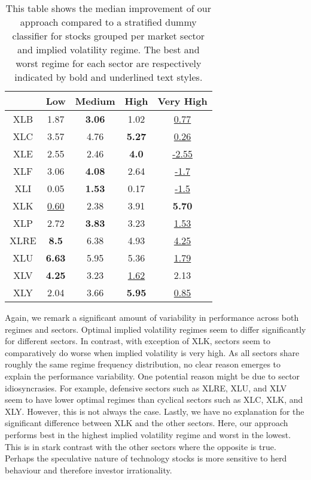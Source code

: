 \documentclass[preprint,1p, times,authoryear]{elsarticle}
\begin{document}
\begin{table}[!ht]
\centering
\setlength{\tabcolsep}{6pt}
\caption{This table shows the median improvement of our approach compared to a stratified dummy classifier for stocks grouped per market sector and implied volatility regime. The best and worst regime for each sector are respectively indicated by bold and underlined text styles.}
\begin{tabular}{ccccc}
\toprule
          & Low & Medium & High &  Very High \\
\midrule
XLB & 1.87 &	\textbf{3.06} &	1.02 &	\underline{0.77} \\
XLC & 3.57 &	4.76 &	\textbf{5.27} &	\underline{0.26} \\
XLE & 2.55 &	2.46 &	\textbf{4.0} &	\underline{-2.55} \\
XLF & 3.06 &	\textbf{4.08} &	2.64 &	\underline{-1.7} \\
XLI & 0.05 &	\textbf{1.53} &	0.17 &	\underline{-1.5} \\
XLK & \underline{0.60} &	2.38 &	3.91 &	\textbf{5.70} \\
XLP & 2.72 &	\textbf{3.83} &	3.23 &	\underline{1.53} \\
XLRE & \textbf{8.5} &	6.38 &	4.93 &	\underline{4.25} \\
XLU & \textbf{6.63} &	5.95 &	5.36 &	\underline{1.79} \\
XLV & \textbf{4.25} &	3.23 &	\underline{1.62} &	2.13 \\
XLY & 2.04 &	3.66 &	\textbf{5.95} & \underline{0.85} \\
\midrule
\end{tabular}
\label{tab:reg2}
\end{table}

Again, we remark a significant amount of variability in performance across both regimes and sectors. Optimal implied volatility regimes seem to differ significantly for different sectors. In contrast, with exception of XLK, sectors seem to comparatively do worse when implied volatility is very high. As all sectors share roughly the same regime frequency distribution, no clear reason emerges to explain the performance variability. One potential reason might be due to sector idiosyncrasies. For example, defensive sectors such as XLRE, XLU, and XLV seem to have lower optimal regimes than cyclical sectors such as XLC, XLK, and XLY. However, this is not always the case. Lastly, we have no explanation for the significant difference between XLK and the other sectors. Here, our approach performs best in the highest implied volatility regime and worst in the lowest. This is in stark contrast with the other sectors where the opposite is true. Perhaps the speculative nature of technology stocks is more sensitive to herd behaviour and therefore investor irrationality.
\end{document}
